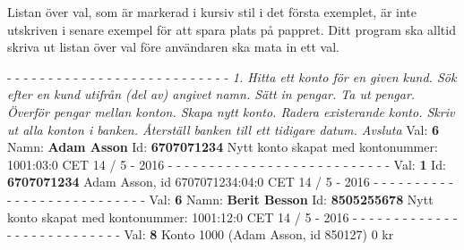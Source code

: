 Listan över val, som är markerad i kursiv stil i det första exemplet, är inte utskriven i senare exempel för att spara plats på pappret. Ditt program ska alltid skriva ut listan över val före användaren ska mata in ett val.
\begin{multicols}{2}
\noindent
- - - - - - - - - - - - - - - - - - - - - - - - - - -\newline
\textit{
1.   Hitta ett konto för en given kund.   Sök efter en kund utifrån (del av) angivet namn.   Sätt in pengar.   Ta ut pengar.   Överför pengar mellan konton.   Skapa nytt konto.   Radera existerande konto.   Skriv ut alla konton i banken.   Återställ banken till ett tidigare datum. Avsluta\newline
}
Val: \textbf{6}\newline
Namn: \textbf{Adam Asson}\newline
Id: \textbf{6707071234}\newline
Nytt konto skapat med kontonummer: 1001:03:0 CET 14 / 5 - 2016\newline
- - - - - - - - - - - - - - - - - - - - - - - - - - -\newline
Val: \textbf{1}\newline
Id: \textbf{6707071234}\newline
Adam Asson, id 6707071234:04:0 CET 14 / 5 - 2016\newline
- - - - - - - - - - - - - - - - - - - - - - - - - - -\newline
Val: \textbf{6}\newline
Namn: \textbf{Berit Besson}\newline
Id: \textbf{8505255678}\newline
Nytt konto skapat med kontonummer: 1001:12:0 CET 14 / 5 - 2016\newline 
- - - - - - - - - - - - - - - - - - - - - - - - - - -\newline
Val: \textbf{8}\newline
Konto 1000 (Adam Asson, id 850127) 0 kr\newline

\end{multicols}
